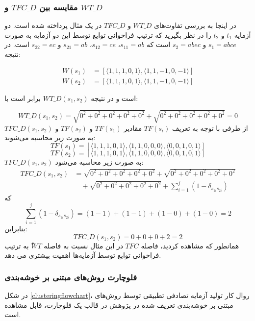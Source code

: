 \subsubsection{مقایسه بین \(TFC\_D\) و \(WT\_D\)}
در اینجا به بررسی تفاوت‌های \(WT\_D\) و \(TFC\_D\) در یک مثال پرداخته شده است. دو آزمایه \(t_1\) و \(t_2\) را در نظر بگیرید که ترتیب فراخوانی توابع توسط این دو آزمایه به صورت \(s_1 = abce\) و \(s_2 = abec\) است که \(s_{11} = ab\)، \(s_{12} = ce\)، \(s_{21} = ab\) و \(s_{22} = ec\) است. در نتیجه:

\begin{align*}
	W(s_1) &= \left[\langle 1, 1, 1, 0, 1 \rangle, \langle 1, 1, -1, 0, -1 \rangle \right] \\
	W(s_2) &= \left[\langle 1, 1, 1, 0, 1 \rangle, \langle 1, 1, -1, 0, -1 \rangle \right]
\end{align*}

است و در نتیجه \({WT\_D}(s_1, s_2)\) برابر است با:

\[
WT\_D(s_1, s_2) = \sqrt{0^2 + 0^2 + 0^2 + 0^2 + 0^2} + \sqrt{0^2 + 0^2 + 0^2 + 0^2 + 0^2} = 0
\]
از طرفی با توجه به تعریف \(TF(s_i)\) مقادیر \(TF(s_1)\) و \(TF(s_2)\) و \(TFC\_D(s_1, s_2)\) به صورت زیر محاسبه می‌شوند:
\[
TF(s_1) = \left[\langle 1, 1, 1, 0, 1 \rangle, \langle 1, 1, 0, 0, 0 \rangle, \langle 0, 0, 1, 0, 1 \rangle\right]
\]
\[
TF(s_2) = \left[\langle 1, 1, 1, 0, 1 \rangle, \langle 1, 1, 0, 0, 0 \rangle, \langle 0, 0, 1, 0, 1 \rangle\right]
\]
\(TFC\_D(s_1, s_2)\) به صورت زیر محاسبه می‌شود:
\begin{align*}
	TFC\_D(s_1, s_2) &= \sqrt{0^2 + 0^2 + 0^2 + 0^2 + 0^2} + \sqrt{0^2 + 0^2 + 0^2 + 0^2 + 0^2} \\
	&\quad + \sqrt{0^2 + 0^2 + 0^2 + 0^2 + 0^2} + \sum_{i=1}^{j} \left(1 - \delta_{s_{1i}s_{2i}}\right)
\end{align*}
که
\[
\sum_{i=1}^{j} \left(1 - \delta_{s_{1i}s_{2i}}\right) = (1-1) + (1-1)  + (1-0)  + (1-0) = 2
\]
بنابراین:
\[
TFC\_D(s_1, s_2) = 0 + 0 + 0 + 2 = 2 
\]
همانطور که مشاهده کردید،‌ فاصله \(TFC\) در این مثال نسبت به فاصله \(ٌُWT\)  به ترتیب فراخوانی توابع توسط آزمایه‌ها اهمیت بیشتری می دهد.

\subsubsection{فلوچارت روش‌های مبتنی بر خوشه‌بندی}

در شکل \ref{clusteringflowchart}، روال کار تولید آزمایه تصادفی تطبیقی توسط روش‌های مبتنی بر خوشه‌بندی تعریف شده در پژوهش \cite{chen2021novel} در قالب یک فلوچارت، قابل مشاهده است.

